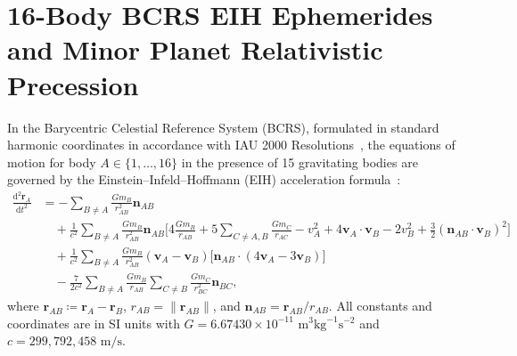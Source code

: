 \documentclass[11pt,a4paper,reqno]{article}
\theoremstyle{plain}
\theoremstyle{definition}
\theoremstyle{remark}
\numberwithin{equation}{section}
\providecommand{\diff}{\mathrm{d}}
\begin{document}
\section{16-Body BCRS EIH Ephemerides and Minor Planet Relativistic Precession}
\label{sec:16body_bcrs_ephemeris}

In the Barycentric Celestial Reference System (BCRS), formulated in standard harmonic coordinates in accordance with IAU 2000 Resolutions~\cite{Soffel2003}, the equations of motion for body $A \in \{1, \dots, 16\}$ in the presence of 15 gravitating bodies are governed by the Einstein--Infeld--Hoffmann (EIH) acceleration formula~\cite{EIH1938, Will1993, Brumberg1991}:
\begin{align}
  \frac{\diff^2 \bm{r}_A}{\diff t^2} &= -\sum_{B \ne A} \frac{G m_B}{r_{AB}^2} \bm{n}_{AB} \nonumber \\
  &\quad + \frac{1}{c^2} \sum_{B \ne A} \frac{G m_B}{r_{AB}^2} \bm{n}_{AB} \Bigg[ 4 \frac{G m_B}{r_{AB}} + 5 \sum_{C \ne A, B} \frac{G m_C}{r_{AC}} - v_A^2 + 4 \bm{v}_A \cdot \bm{v}_B - 2 v_B^2 + \frac{3}{2} (\bm{n}_{AB} \cdot \bm{v}_B)^2 \Bigg] \nonumber \\
  &\quad + \frac{1}{c^2} \sum_{B \ne A} \frac{G m_B}{r_{AB}^2} (\bm{v}_A - \bm{v}_B) \Big[ \bm{n}_{AB} \cdot (4 \bm{v}_A - 3 \bm{v}_B) \Big] \nonumber \\
  &\quad - \frac{7}{2 c^2} \sum_{B \ne A} \frac{G m_B}{r_{AB}} \sum_{C \ne B} \frac{G m_C}{r_{BC}^2} \bm{n}_{BC},
  \label{eq:eih_acceleration}
\end{align}
where $\bm{r}_{AB} \coloneqq \bm{r}_A - \bm{r}_B$, $r_{AB} = \|\bm{r}_{AB}\|$, and $\bm{n}_{AB} = \bm{r}_{AB} / r_{AB}$. All constants and coordinates are in SI units with $G = 6.67430 \times 10^{-11}\text{ m}^3\text{kg}^{-1}\text{s}^{-2}$ and $c = 299{,}792{,}458\text{ m/s}$.
\end{document}
